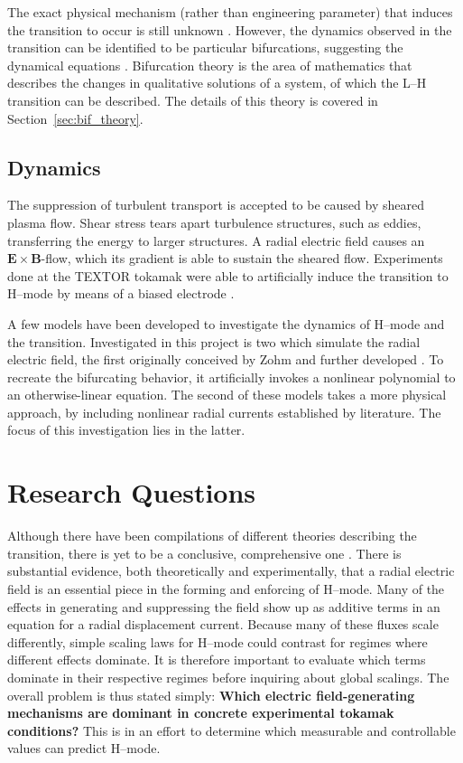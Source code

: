 The exact physical mechanism (rather than engineering parameter) that induces the transition to occur is still unknown \cite{itoh_structural_2016}.
However, the dynamics observed in the transition can be identified to be particular bifurcations, suggesting the dynamical equations \cite{weymiens_bifurcation_2012}.
Bifurcation theory is the area of mathematics that describes the changes in qualitative solutions of a system, of which the L--H transition can be described.
The details of this theory is covered in Section~\ref{sec:bif_theory}.

\subsection{Dynamics}\label{ssec:dynamics}
The suppression of turbulent transport is accepted to be caused by sheared plasma flow.
Shear stress tears apart turbulence structures, such as eddies, transferring the energy to larger structures.
A radial electric field causes an $\mathbf{E}\times\mathbf{B}$-flow, which its gradient is able to sustain the sheared flow.
Experiments done at the TEXTOR tokamak were able to artificially induce the transition to H--mode by means of a biased electrode \cite{weynants_confinement_1992}.

A few models have been developed to investigate the dynamics of H--mode and the transition.
Investigated in this project is two which simulate the radial electric field, the first originally conceived by Zohm \cite{zohm_dynamic_1994} and further developed \cite{paquay_studying_2012} \cite{weymiens_bifurcation_2014}.
To recreate the bifurcating behavior, it artificially invokes a nonlinear polynomial to an otherwise-linear equation.
The second of these models takes a more physical approach, by including nonlinear radial currents established by literature.
The focus of this investigation lies in the latter.

\section{Research Questions}\label{sec:research_questions}
Although there have been compilations of different theories describing the transition, there is yet to be a conclusive, comprehensive one \cite{connor_review_2000}.
There is substantial evidence, both theoretically and experimentally, that a radial electric field is an essential piece in the forming and enforcing of H--mode.
Many of the effects in generating and suppressing the field show up as additive terms in an equation for a radial displacement current.
Because many of these fluxes scale differently, simple scaling laws for H--mode could contrast for regimes where different effects dominate.
It is therefore important to evaluate which terms dominate in their respective regimes before inquiring about global scalings.
The overall problem is thus stated simply: \textbf{Which electric field-generating mechanisms are dominant in concrete experimental tokamak conditions?}
This is in an effort to determine which measurable and controllable values can predict H--mode.

